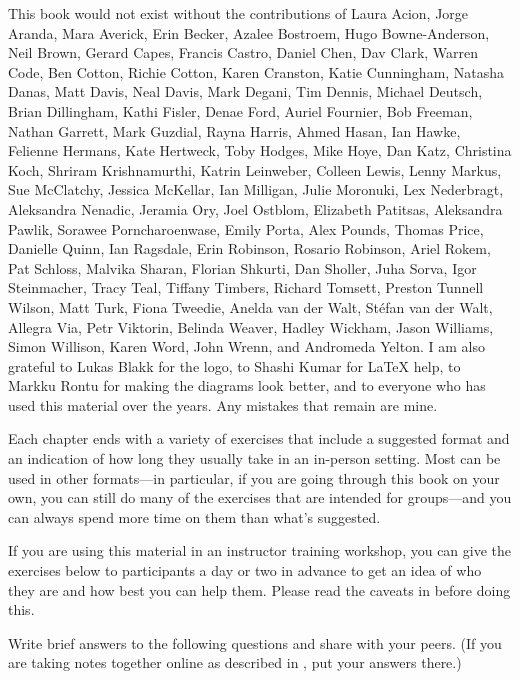 
This book would not exist without the contributions of
Laura Acion,
Jorge Aranda,
Mara Averick,
Erin Becker,
Azalee Bostroem,
Hugo Bowne-Anderson,
Neil Brown,
Gerard Capes,
Francis Castro,
Daniel Chen,
Dav Clark,
Warren Code,
Ben Cotton,
Richie Cotton,
Karen Cranston,
Katie Cunningham,
Natasha Danas,
Matt Davis,
Neal Davis,
Mark Degani,
Tim Dennis,
Michael Deutsch,
Brian Dillingham,
Kathi Fisler,
Denae Ford,
Auriel Fournier,
Bob Freeman,
Nathan Garrett,
Mark Guzdial,
Rayna Harris,
Ahmed Hasan,
Ian Hawke,
Felienne Hermans,
Kate Hertweck,
Toby Hodges,
Mike Hoye,
Dan Katz,
Christina Koch,
Shriram Krishnamurthi,
Katrin Leinweber,
Colleen Lewis,
Lenny Markus,
Sue McClatchy,
Jessica McKellar,
Ian Milligan,
Julie Moronuki,
Lex Nederbragt,
Aleksandra Nenadic,
Jeramia Ory,
Joel Ostblom,
Elizabeth Patitsas,
Aleksandra Pawlik,
Sorawee Porncharoenwase,
Emily Porta,
Alex Pounds,
Thomas Price,
Danielle Quinn,
Ian Ragsdale,
Erin Robinson,
Rosario Robinson,
Ariel Rokem,
Pat Schloss,
Malvika Sharan,
Florian Shkurti,
Dan Sholler,
Juha Sorva,
Igor Steinmacher,
Tracy Teal,
Tiffany Timbers,
Richard Tomsett,
Preston Tunnell Wilson,
Matt Turk,
Fiona Tweedie,
Anelda van der Walt,
Stéfan van der Walt,
Allegra Via,
Petr Viktorin,
Belinda Weaver,
Hadley Wickham,
Jason Williams,
Simon Willison,
Karen Word,
John Wrenn,
and Andromeda Yelton.
I am also grateful to Lukas Blakk for the logo,
to Shashi Kumar for LaTeX help,
to Markku Rontu for making the diagrams look better,
and to everyone who has used this material over the years.
Any mistakes that remain are mine.


Each chapter ends with a variety of exercises that include a suggested format
and an indication of how long they usually take in an in-person setting.
Most can be used in other formats---in particular,
if you are going through this book on your own,
you can still do many of the exercises that are intended for groups---and
you can always spend more time on them than what's suggested.

If you are using this material in an instructor training workshop,
you can give the exercises below to participants a day or two in advance
to get an idea of who they are and how best you can help them.
Please read the caveats in  before doing this.


Write brief answers to the following questions and share with your peers.
(If you are taking notes together online as described in ,
put your answers there.)

